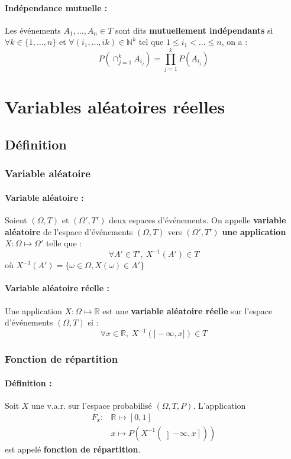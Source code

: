 \documentclass[10pt,a4paper,twoside]{article}
\begin{document}
\paragraph{Indépendance mutuelle :} Les événements $A_{1},\ldots,A_{n}\in T$ sont dits \textbf{mutuellement indépendants} si $\forall k \in \{1,\ldots,n\}$ et $\forall(i_{1},\ldots,i{k})\in \mathbb{N}^{k}$ tel que $1 \leqslant i_{1} < \ldots \leqslant n$, on a :
$$P(\cap_{j=1}^{k}A_{i_{j}}) = \prod_{j=1}^{k}P(A_{i_{j}})$$

\section{Variables aléatoires réelles}
\subsection{Définition}
\subsubsection{Variable aléatoire}
\paragraph{Variable aléatoire :} Soient $(\Omega,T)$ et $(\Omega',T')$ deux espaces d'événements. On appelle \textbf{variable aléatoire} de l'espace d'événements $(\Omega,T)$ vers $(\Omega',T')$ \textbf{une application} $X:\Omega\mapsto\Omega'$ telle que :
$$\forall A' \in T',\ X^{-1}(A')\in T$$
où $X^{-1}(A') = \{\omega \in \Omega, X(\omega) \in A'\}$

\paragraph{Variable aléatoire réelle :} Une application $X:\Omega\mapsto \mathbb{R}$ est une \textbf{variable aléatoire réelle} sur l'espace d'événements $(\Omega,T)$ si :
$$\forall x\in \mathbb{R},\ X^{-1}\left(]-\infty,x]\right)\in T$$

\subsubsection{Fonction de répartition}

\paragraph{Définition :} Soit $X$ une v.a.r. sur l'espace probabilisé $(\Omega,T,P)$. L'application
\begin{align*}
F_{x}: & \mathbb{R}\longmapsto [0,1]\\
 & x\longmapsto P\left(X^{-1}\left(\left]-\infty,x\right]\right)\right)
\end{align*}
est appelé \textbf{fonction de répartition}.
\end{document}
